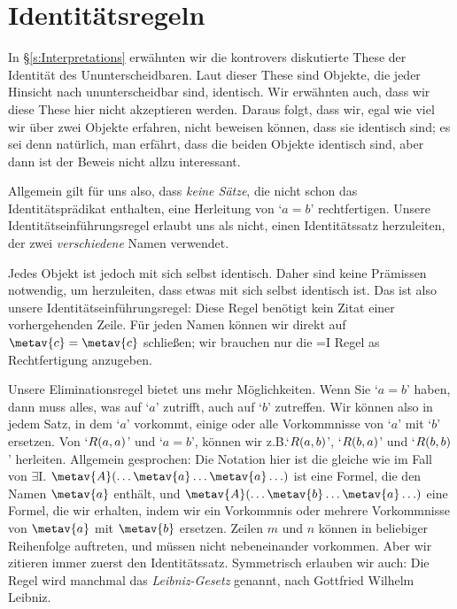\chapter{Identitätsregeln}
In \S\ref{s:Interpretations} erwähnten wir die kontrovers diskutierte These der Identität des Ununterscheidbaren. Laut dieser These sind Objekte, die jeder Hinsicht nach ununterscheidbar sind, identisch. Wir erwähnten auch, dass wir diese These hier nicht akzeptieren werden. Daraus folgt, dass wir, egal wie viel wir über zwei Objekte erfahren, nicht beweisen können, dass sie identisch sind; es sei denn natürlich, man erfährt, dass die beiden Objekte identisch sind, aber dann ist der Beweis nicht allzu interessant.

Allgemein gilt für uns also, dass \emph{keine Sätze}, die nicht schon das Identitätsprädikat enthalten, eine Herleitung von `$a=b$' rechtfertigen. Unsere Identitätseinführungsregel erlaubt uns als nicht, einen Identitätssatz herzuleiten, der zwei \emph{verschiedene} Namen verwendet.

Jedes Objekt ist jedoch mit sich selbst identisch. Daher sind keine Prämissen notwendig, um herzuleiten, dass etwas mit sich selbst identisch ist. Das ist also unsere Identitätseinführungsregel:
Diese Regel benötigt kein Zitat einer vorhergehenden Zeile. Für jeden Namen  können wir direkt auf $\metav{c}=\metav{c}$ schlie{\ss}en; wir brauchen nur die {=}I Regel as Rechtfertigung anzugeben. 

Unsere Eliminationsregel bietet uns mehr Möglichkeiten. Wenn Sie `$a=b$' haben, dann muss alles, was auf `$a$' zutrifft, auch auf `$b$' zutreffen. Wir können also in jedem Satz, in dem `$a$' vorkommt, einige oder alle Vorkommnisse von `$a$' mit `$b$' ersetzen. Von `$\mathord{R}(a,a)$' und `$a = b$', können wir z.B.\@ `$\mathord{R}(a,b)$', `$\mathord{R}(b,a)$' und `$\mathord{R}(b,b)$' herleiten. Allgemein gesprochen:
Die Notation hier ist die gleiche wie im Fall von $\exists$I. $\metav{A}(\ldots \metav{a} \ldots \metav{a}\ldots)$ ist eine Formel, die den Namen $\metav{a}$ enthält, und $\metav{A}(\ldots \metav{b} \ldots \metav{a}\ldots)$ eine Formel, die wir erhalten, indem wir ein Vorkommnis oder mehrere Vorkommnisse von $\metav{a}$ mit $\metav{b}$ ersetzen. Zeilen $m$ und $n$ können in beliebiger Reihenfolge auftreten, und müssen nicht nebeneinander vorkommen. Aber wir zitieren immer zuerst den Identitätssatz. Symmetrisch erlauben wir auch:
Die Regel wird manchmal das \emph{Leibniz-Gesetz} genannt, nach Gottfried Wilhelm Leibniz. 

